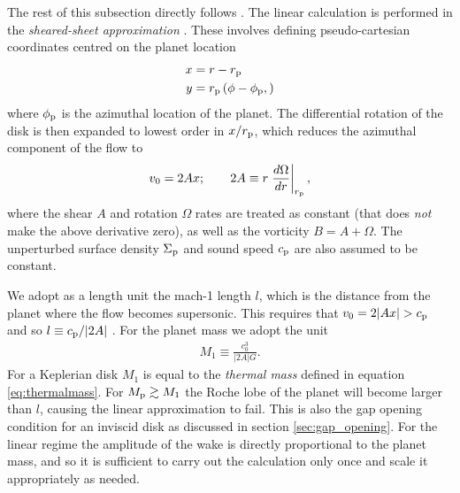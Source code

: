 The rest of this subsection directly follows \citet{goodman2001}. 
The linear calculation is performed in the \textit{sheared-sheet approximation} \citep{hill1878}.
These involves defining pseudo-cartesian coordinates centred on the planet location
\begin{align}
    x &= r - r_{\rm p} \\
    y &= r_{\rm p} \left( \phi - \phi_{\rm p} ,\right)
\end{align}
where $\phi_{\rm p}$ is the azimuthal location of the planet.
The differential rotation of the disk is then expanded to lowest order in $x/r_{\rm p}$, which reduces the azimuthal component of the flow to
\begin{align}
    v_0 = 2 A x; \qquad 2A \equiv r \left. \frac{d \Omega}{dr} \right|_{r_{\rm p}},
\end{align}
where the shear $A$ and rotation $\Omega$ rates are treated as constant (that does \textit{not} make the above derivative zero), as well as the vorticity $B=A+\Omega$.
The unperturbed surface density $\Sigma_{\rm p}$ and sound speed $c_{\rm p}$ are also assumed to be constant.

We adopt as a length unit the mach-1 length $l$, which is the distance from the planet where the flow becomes supersonic.
This requires that $v_0 = 2|Ax| > c_{\rm p}$ and so $l \equiv c_{\rm p} / |2A|$ . For the planet mass we adopt the unit
\begin{align}
    M_1 \equiv \frac{c_0^3}{|2A|G}.
\end{align}
For a Keplerian disk $M_1$ is equal to the \textit{thermal mass} defined in equation \ref{eq:thermalmass}.
For $M_{\rm p} \gtrsim M_1$ the Roche lobe of the planet will become larger than $l$, causing the linear approximation to fail.
This is also the gap opening condition for an inviscid disk as discussed in section \ref{sec:gap_opening}.
For the linear regime the amplitude of the wake is directly proportional to the planet mass, and so it is sufficient to carry out the calculation only once and scale it appropriately as needed.

